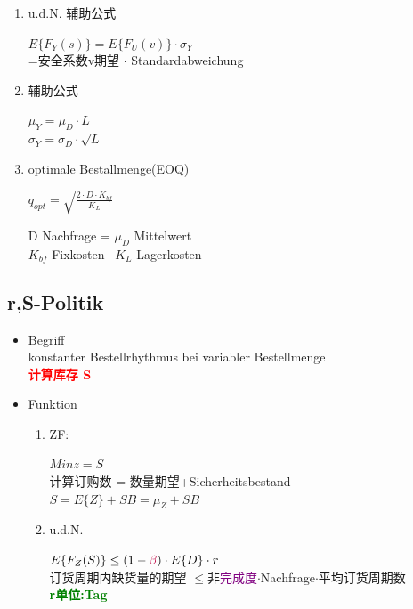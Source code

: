 \documentclass[12pt, letterpaper]{article}
\begin{document}
\begin{CJK*}{UTF8}{gbsn}
\begin{itemize}
\begin{enumerate}
\item u.d.N. 辅助公式
\begin{center}
$E\{F_Y(s)\} = E\{F_U(v)\} \cdot \sigma_Y$\\
=安全系数v期望 $\cdot$ Standardabweichung
\end{center}

\item 辅助公式
\begin{center}
$\mu_Y = \mu_D \cdot L$\\
$\sigma_Y = \sigma_D \cdot \sqrt{L}$
\end{center}



\item optimale Bestallmenge(EOQ) \\
\begin{center}
$q_{opt} = \sqrt{\frac{2 \cdot D \cdot K_{bf}}{K_L}}$\\
\end{center}
D Nachfrage = $\mu_D$ Mittelwert\\
$K_{bf}$ Fixkosten \ $K_L$ Lagerkosten



\end{enumerate}


\end{itemize}

\newpage
\subsection{r,S-Politik}

\begin{itemize}
\item Begriff\\
konstanter Bestellrhythmus bei variabler Bestellmenge\\
\textcolor{red}{\textbf{计算库存 S}}

\item Funktion

\begin{enumerate}

\item ZF:
\begin{center}
$Min z = S$\\
计算订购数 = 数量期望+Sicherheitsbestand\\
$S=E\{Z\}+SB=\mu_Z + SB$ \\
\end{center}

\item u.d.N.\\
\begin{center}
$E\{F_Z(S)\} \leq (1-\textcolor{purple}{\beta}) \cdot E\{D\} \cdot r$\\
订货周期内缺货量的期望 $\leq$非\textcolor{purple}{完成度}$\cdot$Nachfrage$\cdot$平均订货周期数\\
\textcolor{green}{\textbf{r单位:Tag}}
\end{center}



\end{enumerate}
\end{itemize}
\end{CJK*}
\end{document}
